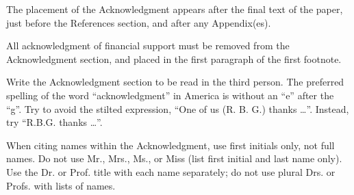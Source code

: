 \documentclass [a4paper,final,conference,10pt]{IDAACS}
\begin{document}
The placement of the Acknowledgment appears after the final text of the 
paper, just before the References section, and after any Appendix(es).

All acknowledgment of financial support must be removed from the 
Acknowledgment section, and placed in the first paragraph of the first 
footnote.

Write the Acknowledgment section to be read in the third person.
\enlargethispage{-7in}
The preferred spelling of the word ``acknowledgment'' in America 
is without an ``e'' after the ``g''. Try to avoid the stilted 
expression, ``One of us (R. B. G.) thanks \ldots''. Instead, 
try ``R.B.G. thanks \ldots{}''. 

When citing names within the Acknowledgment, use first initials 
only, not full names. Do not use Mr., Mrs., Ms., or Miss 
(list first initial and last name only). Use the Dr. or Prof. 
title with each name separately; do not use plural Drs. or 
Profs. with lists of names.




\end{document}
